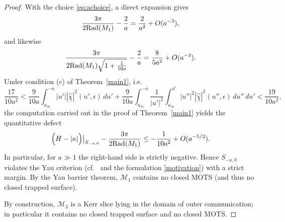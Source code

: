 \documentclass{amsart}
\begin{document}
{\begin{proof}
\noindent With the choice \eqref{eq:achoice}, a direct expansion gives
\begin{equation}\label{eq:rad-expand-1}
\frac{3\pi}{2\text{Rad}(\mathcal \mathcal{M}_{1})}-\frac{2}{a}
=\frac{2}{ a^2}+O(a^{-3}),
\end{equation}
and likewise
\begin{equation}\label{eq:rad-expand-2}
\frac{3\pi}{2\text{Rad}(\mathcal \mathcal{M}_{1})\sqrt{1+\frac{1}{10a}}}-\frac{2}{a}
=\frac{8}{5 a^2}+O(a^{-3}).
\end{equation}
Under condition {\rm(c)} of Theorem~\ref{main1}, i.e.
\begin{equation}\label{eq:condc}
\frac{17}{10 a^{2}}
<
\frac{9}{10a}\int_{u_{\infty}}^{-a}|u'||\underline{\hat\chi}|^{2}(u',\epsilon)\,du'
+\frac{9}{10a}\int_{u_{\infty}}^{-a}\frac{1}{|u'|^{2}}\int_{u_{\infty}}^{u'}|u''|^{2}|\underline{\hat\chi}|^{2}(u'',\epsilon)\,du''\,du'
<
\frac{19}{10 a^{2}},
\end{equation}
the computation carried out in the proof of Theorem~\ref{main1} yields the quantitative defect
\begin{equation}\label{eq:yau-defect}
\Big(H-|\kappa|\Big)\big|_{S_{-a,0}}
-\frac{3\pi}{2\text{Rad}(\mathcal \mathcal{M}_{1})}
\le
-\frac{1}{10 a^2}+O(a^{-5/2}).
\end{equation}
In particular, for $a\gg1$ the right-hand side is strictly negative. Hence $S_{-a,0}$ violates the Yau criterion (cf.\ \cite{yau} and the formulation \ref{motivation}) with a strict margin. By the Yau barrier theorem, $\mathcal{M}_{1}$ contains no closed MOTS (and thus no closed trapped surface).

\medskip
\noindent By construction, $\mathcal M_3$ is a Kerr slice lying in the domain of outer communication; in particular it contains no closed trapped surface and no closed MOTS.


\end{proof}}
\end{document}
